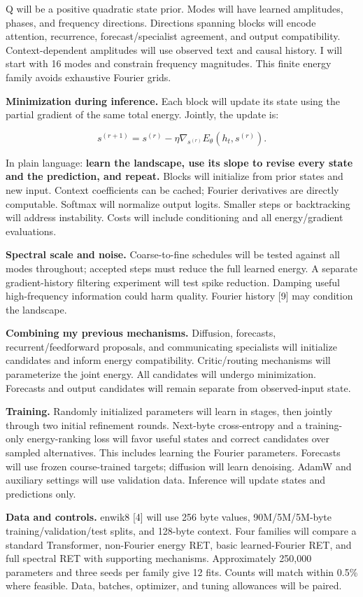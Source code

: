 \documentclass[11pt,letterpaper]{article}
\begin{document}
Q will be a positive quadratic state prior. Modes will have learned amplitudes, phases, and frequency directions. Directions spanning blocks will encode attention, recurrence, forecast/specialist agreement, and output compatibility. Context-dependent amplitudes will use observed text and causal history. I will start with 16 modes and constrain frequency magnitudes. This finite energy family avoids exhaustive Fourier grids.

\textbf{Minimization during inference.} Each block will update its state using the partial gradient of the same total energy. Jointly, the update is:

\[
s^{(r+1)}=s^{(r)}-\eta\nabla_{s^{(r)}}E_\theta(h_t,s^{(r)}).
\]

In plain language: \textbf{learn the landscape, use its slope to revise every state and the prediction, and repeat.} Blocks will initialize from prior states and new input. Context coefficients can be cached; Fourier derivatives are directly computable. Softmax will normalize output logits. Smaller steps or backtracking will address instability. Costs will include conditioning and all energy/gradient evaluations.

\textbf{Spectral scale and noise.} Coarse-to-fine schedules will be tested against all modes throughout; accepted steps must reduce the full learned energy. A separate gradient-history filtering experiment will test spike reduction. Damping useful high-frequency information could harm quality. Fourier history [9] may condition the landscape.

\textbf{Combining my previous mechanisms.} Diffusion, forecasts, recurrent/feedforward proposals, and communicating specialists will initialize candidates and inform energy compatibility. Critic/routing mechanisms will parameterize the joint energy. All candidates will undergo minimization. Forecasts and output candidates will remain separate from observed-input state.

\textbf{Training.} Randomly initialized parameters will learn in stages, then jointly through two initial refinement rounds. Next-byte cross-entropy and a training-only energy-ranking loss will favor useful states and correct candidates over sampled alternatives. This includes learning the Fourier parameters. Forecasts will use frozen course-trained targets; diffusion will learn denoising. AdamW and auxiliary settings will use validation data. Inference will update states and predictions only.

\textbf{Data and controls.} enwik8 [4] will use 256 byte values, 90M/5M/5M-byte training/validation/test splits, and 128-byte context. Four families will compare a standard Transformer, non-Fourier energy RET, basic learned-Fourier RET, and full spectral RET with supporting mechanisms. Approximately 250,000 parameters and three seeds per family give 12 fits. Counts will match within 0.5\% where feasible. Data, batches, optimizer, and tuning allowances will be paired.
\end{document}
